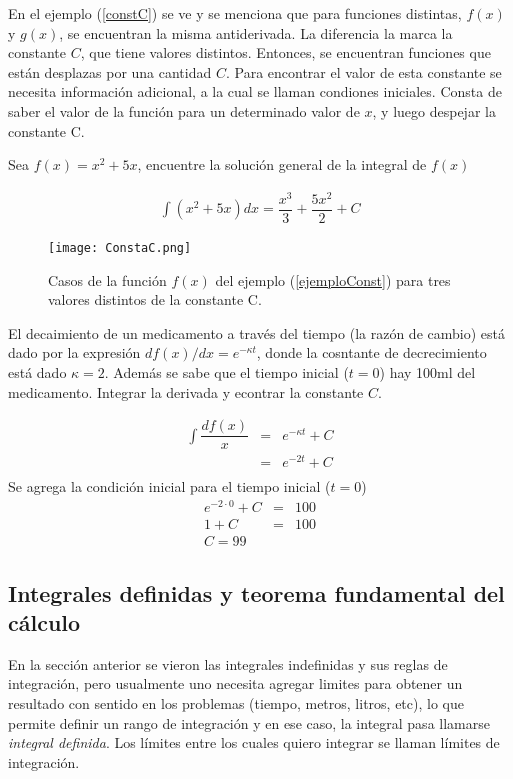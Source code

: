 En el ejemplo (\ref{constC}) se ve y se menciona que para funciones distintas, $f(x)$ y $g(x)$, se encuentran la misma antiderivada. La diferencia la marca la constante $C$, que tiene valores distintos. Entonces, se encuentran funciones que están desplazas por una cantidad $C$. Para encontrar el valor de esta constante se necesita información adicional, a la cual se llaman condiones iniciales. Consta de saber el valor de la función para un determinado valor de $x$, y luego despejar la constante C. 
 \begin{myexample}
 Sea $f(x)=x^{2}+5x$, encuentre la solución general de la integral de $f(x)$
 \label{ejemploConst}
 \end{myexample}
 \begin{eqnarray*}
 \int (x^{2}+5x)dx= \dfrac{x^{3}}{3}+ \dfrac{5x^{2}}{2}+C
 \end{eqnarray*}

\begin{figure}
\centering
\texttt{[image: ConstaC.png]}
\caption{Casos de la función $f(x)$ del ejemplo (\ref{ejemploConst}) para tres valores distintos de la constante C.}
\end{figure} 
 
 \begin{myexample}
El decaimiento de un medicamento a través del tiempo (la razón de cambio) está dado por la expresión $df(x)/dx=e^{-\kappa t}$, donde la cosntante de decrecimiento está dado $\kappa =2$. Además se sabe que el tiempo inicial ($t=0$) hay 100ml del medicamento. Integrar la derivada y econtrar la constante $C$. 
\end{myexample}
\begin{eqnarray*}
\int \dfrac{df(x)}{x}&=& e^{-\kappa t} +C \\
&=& e^{-2 t}+C \\
\end{eqnarray*}
Se agrega la condición inicial para el tiempo inicial ($t=0$)
\begin{eqnarray*}
e^{-2 \cdot 0}+C &=& 100\\
1+C &=& 100 \\
C= 99
\end{eqnarray*} 
\subsection{Integrales definidas y teorema fundamental del cálculo}

En la sección anterior se vieron las integrales indefinidas y sus reglas de integración, pero usualmente uno necesita agregar limites para obtener un resultado con sentido en los problemas (tiempo, metros, litros, etc), lo que permite definir un rango de integración y en ese caso, la integral pasa llamarse \textit{integral definida}. Los límites entre los cuales quiero integrar se llaman límites de integración.

